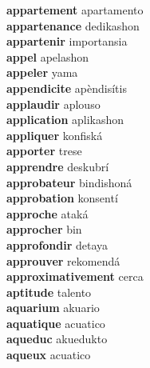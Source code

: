 \textbf{appartement } apartamento \\
\textbf{appartenance } dedikashon \\
\textbf{appartenir } importansia \\
\textbf{appel } apelashon \\
\textbf{appeler } yama \\
\textbf{appendicite } apèndisítis \\
\textbf{applaudir } aplouso \\
\textbf{application } aplikashon \\
\textbf{appliquer } konfiská \\
\textbf{apporter } trese \\
\textbf{apprendre } deskubrí \\
\textbf{approbateur } bindishoná \\
\textbf{approbation } konsentí \\
\textbf{approche } ataká \\
\textbf{approcher } bin \\
\textbf{approfondir } detaya \\
\textbf{approuver } rekomendá \\
\textbf{approximativement } cerca \\
\textbf{aptitude } talento \\
\textbf{aquarium } akuario \\
\textbf{aquatique } acuatico \\
\textbf{aqueduc } akuedukto \\
\textbf{aqueux } acuatico \\
